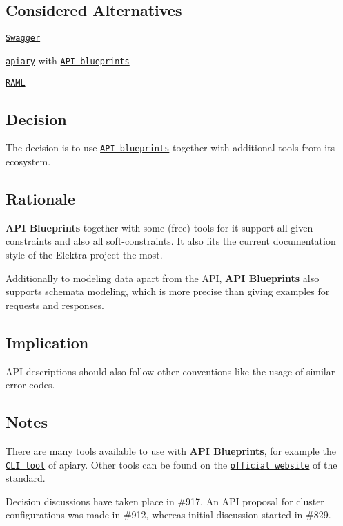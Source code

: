 \subsection*{Considered Alternatives}


\begin{DoxyItemize}
\item \href{http://swagger.io/}{\tt Swagger}
\item \href{https://apiary.io/}{\tt apiary} with \href{https://apiblueprint.org/}{\tt A\+PI blueprints}
\item \href{http://raml.org/}{\tt R\+A\+ML}
\end{DoxyItemize}

\subsection*{Decision}

The decision is to use \href{https://apiblueprint.org/}{\tt A\+PI blueprints} together with additional tools from its ecosystem.

\subsection*{Rationale}

{\bfseries A\+PI Blueprints} together with some (free) tools for it support all given constraints and also all soft-\/constraints. It also fits the current documentation style of the Elektra project the most.

Additionally to modeling data apart from the A\+PI, {\bfseries A\+PI Blueprints} also supports schemata modeling, which is more precise than giving examples for requests and responses.

\subsection*{Implication}


\begin{DoxyItemize}
\item A\+PI descriptions should also follow other conventions like the usage of similar error codes.
\end{DoxyItemize}

\subsection*{Notes}

There are many tools available to use with {\bfseries A\+PI Blueprints}, for example the \href{https://github.com/apiaryio/apiary-client}{\tt C\+LI tool} of apiary. Other tools can be found on the \href{https://apiblueprint.org/tools.html}{\tt official website} of the standard.

Decision discussions have taken place in \#917. An A\+PI proposal for cluster configurations was made in \#912, whereas initial discussion started in \#829. 